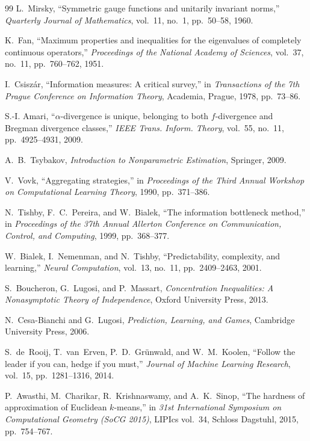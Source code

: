 \documentclass[12pt]{article}
\theoremstyle{definition}
\begin{document}
\begin{thebibliography}{99}
L.~Mirsky,
``Symmetric gauge functions and unitarily invariant norms,''
\emph{Quarterly Journal of Mathematics}, vol.~11, no.~1, pp.~50--58, 1960.

K.~Fan,
``Maximum properties and inequalities for the eigenvalues of completely
continuous operators,''
\emph{Proceedings of the National Academy of Sciences},
vol.~37, no.~11, pp.~760--762, 1951.

I.~Csisz\'ar,
``Information measures: A critical survey,''
in \emph{Transactions of the 7th Prague Conference on Information Theory},
Academia, Prague, 1978, pp.~73--86.

S.-I. Amari,
``$\alpha$-divergence is unique, belonging to both $f$-divergence and
Bregman divergence classes,''
\emph{IEEE Trans. Inform. Theory}, vol.~55, no.~11, pp.~4925--4931, 2009.

A.~B.~Tsybakov,
\emph{Introduction to Nonparametric Estimation},
Springer, 2009.

V.~Vovk,
``Aggregating strategies,''
in \emph{Proceedings of the Third Annual Workshop on Computational Learning
Theory}, 1990, pp.~371--386.

N.~Tishby, F.~C.~Pereira, and W.~Bialek,
``The information bottleneck method,''
in \emph{Proceedings of the 37th Annual Allerton Conference on Communication,
Control, and Computing}, 1999, pp.~368--377.

W.~Bialek, I.~Nemenman, and N.~Tishby,
``Predictability, complexity, and learning,''
\emph{Neural Computation}, vol.~13, no.~11, pp.~2409--2463, 2001.

S.~Boucheron, G.~Lugosi, and P.~Massart,
\emph{Concentration Inequalities: A Nonasymptotic Theory of Independence},
Oxford University Press, 2013.

N.~Cesa-Bianchi and G.~Lugosi,
\emph{Prediction, Learning, and Games},
Cambridge University Press, 2006.

S.~de~Rooij, T.~van~Erven, P.~D.~Gr\"unwald, and W.~M.~Koolen,
``Follow the leader if you can, hedge if you must,''
\emph{Journal of Machine Learning Research},
vol.~15, pp.~1281--1316, 2014.

P.~Awasthi, M.~Charikar, R.~Krishnaswamy, and A.~K.~Sinop,
``The hardness of approximation of Euclidean $k$-means,''
in \emph{31st International Symposium on Computational Geometry (SoCG 2015)},
LIPIcs vol.~34, Schloss Dagstuhl, 2015, pp.~754--767.


\end{thebibliography}
\end{document}
